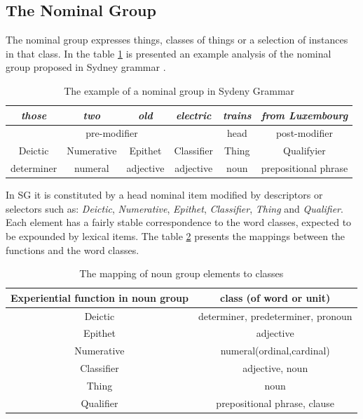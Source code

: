 \subsection{The Nominal Group}
\label{sec:nominal-group}
The nominal group expresses things, classes of things or a selection of instances in that class. In the table \ref{tab:example-ng} is presented an example analysis of the nominal group proposed in Sydney grammar \citep[pp.~364--369]{Halliday2013}. 
\begin{table}[!ht]
	\begin{tabular}{|c|c|c|c|c|c|}
		\hline
		\textit{those} & \textit{two} & \textit{old} & \textit{electric} & \textit{trains} & \textit{from Luxembourg} \\ \hline
		\multicolumn{4}{|c|}{pre-modifier}                               & head            & post-modifier            \\ \hline
		Deictic        & Numerative   & Epithet      & Classifier        & Thing           & Qualifyier               \\ \hline
		determiner     & numeral      & adjective    & adjective         & noun            & prepositional phrase     \\ \hline
	\end{tabular}
	\caption{The example of a nominal group in Sydeny Grammar}
	\label{tab:example-ng}
\end{table}

In SG it is constituted by a head nominal item modified by descriptors or selectors such as: \textit{Deictic}, \textit{Numerative}, \textit{Epithet}, \textit{Classifier}, \textit{Thing} and \textit{Qualifier}. Each element has a fairly stable correspondence to the word classes, expected to be expounded by lexical items. The table \ref{tab:function-pos-mapping} presents the mappings between the functions and the word classes.

\begin{table}[h]
	\begin{tabular}{|c|c|}
		\hline
		\textbf{Experiential function in noun group} & \textbf{class (of word or unit)} \\ \hline
		Deictic                             & determiner, predeterminer, pronoun \\ \hline
		Epithet                             & adjective                    \\ \hline
		Numerative                          & numeral(ordinal,cardinal)    \\ \hline
		Classifier                          & adjective, noun              \\ \hline
		Thing                               & noun                         \\ \hline
		Qualifier                           & prepositional phrase, clause \\ \hline
	\end{tabular}
	\caption{The mapping of noun group elements to classes}
	\label{tab:function-pos-mapping}
\end{table}

